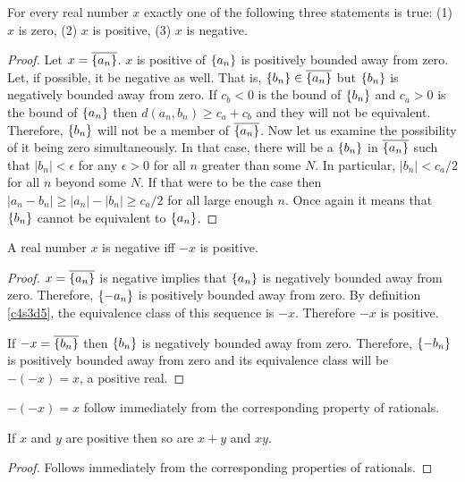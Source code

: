 \begin{lem}\label{c4s4l1}
For every real number $x$ exactly one of the following three statements
is true: (1) $x$ is zero, (2) $x$ is positive, (3) $x$ is negative. 
\end{lem}
\begin{proof}
Let $x = \overline{\{a_n\}}$. $x$ is positive of $\{a_n\}$ is 
positively bounded away from zero. Let, if possible, it be negative as 
well. That is, $\{b_n\} \in \overline{\{a_n\}}$ but $\{b_n\}$ is
negatively bounded away from zero. If $c_b < 0$ is the bound of $\{b_n\}$
and $c_a > 0$ is the bound of $\{a_n\}$ then $d(a_n, b_n) \ge c_a + c_b
$ and they will not be equivalent. Therefore, $\{b_n\}$ will not be a 
member of $\overline{\{a_n\}}$. Now let us examine the possibility
of it being zero simultaneously. In that case, there will be a $\{b_n\}$
in $\overline{\{a_n\}}$ such that $|b_n| < \epsilon$ for any $\epsilon > 
0$ for all $n$ greater than some $N$. In particular, $|b_n| < c_a/2$ for 
all $n$ beyond some $N$. If that were to be the case then $|a_n - b_n| \ge
|a_n| - |b_n| \ge c_a/2$ for all large enough $n$. Once again it means 
that $\{b_n\}$ cannot be equivalent to $\{a_n\}$.
\end{proof}

\begin{lem}\label{c4s4l2}
A real number $x$ is negative iff $-x$ is positive.
\end{lem}
\begin{proof}
$x = \overline{\{a_n\}}$ is negative implies that $\{a_n\}$ is 
negatively bounded away from zero. Therefore, $\{-a_n\}$ is positively
bounded away from zero. By definition \ref{c4s3d5}, the equivalence class
of this sequence is $-x$. Therefore $-x$ is positive.

If $-x = \overline{\{b_n\}}$ then $\{b_n\}$ is negatively bounded away
from zero. Therefore, $\{-b_n\}$ is positively bounded away from zero 
and its equivalence class will be $-(-x) = x$, a positive real.
\end{proof}

\begin{rem}
$-(-x) = x$ follow immediately from the corresponding property of 
rationals.
\end{rem}

\begin{lem}\label{c4s4l3}
If $x$ and $y$ are positive then so are $x + y$ and $xy$.
\end{lem}
\begin{proof}
Follows immediately from the corresponding properties of rationals.
\end{proof}

